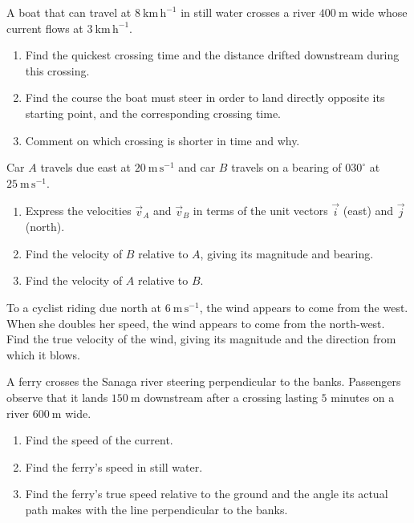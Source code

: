 \documentclass[11pt]{article}
\newcounter{popsec}
\newcounter{popsub}
\newcommand{\courssub}[1]{%
  \stepcounter{popsub}%
  \par\vspace{9pt}\noindent{\popxbold\fontsize{11.5}{13}\selectfont\color{popink}{\color{poporange}\thepopsec.\thepopsub}\hspace{6pt}#1}\par\nopagebreak\vspace{4pt}
}
\begin{document}
\courssub{I practise}

\begin{exercice}
A boat that can travel at $8\ \mathrm{km\,h^{-1}}$ in still water crosses a river $400\ \mathrm{m}$ wide whose current flows at $3\ \mathrm{km\,h^{-1}}$.
\begin{enumerate}
\item Find the quickest crossing time and the distance drifted downstream during this crossing.
\item Find the course the boat must steer in order to land directly opposite its starting point, and the corresponding crossing time.
\item Comment on which crossing is shorter in time and why.
\end{enumerate}
\end{exercice}

\begin{exercice}
Car $A$ travels due east at $20\ \mathrm{m\,s^{-1}}$ and car $B$ travels on a bearing of $030^{\circ}$ at $25\ \mathrm{m\,s^{-1}}$.
\begin{enumerate}
\item Express the velocities $\vec{v}_A$ and $\vec{v}_B$ in terms of the unit vectors $\vec{i}$ (east) and $\vec{j}$ (north).
\item Find the velocity of $B$ relative to $A$, giving its magnitude and bearing.
\item Find the velocity of $A$ relative to $B$.
\end{enumerate}
\end{exercice}

\begin{exercice}
To a cyclist riding due north at $6\ \mathrm{m\,s^{-1}}$, the wind appears to come from the west. When she doubles her speed, the wind appears to come from the north-west. Find the true velocity of the wind, giving its magnitude and the direction from which it blows.
\end{exercice}

\begin{exercice}
A ferry crosses the Sanaga river steering perpendicular to the banks. Passengers observe that it lands $150\ \mathrm{m}$ downstream after a crossing lasting $5$ minutes on a river $600\ \mathrm{m}$ wide.
\begin{enumerate}
\item Find the speed of the current.
\item Find the ferry's speed in still water.
\item Find the ferry's true speed relative to the ground and the angle its actual path makes with the line perpendicular to the banks.
\end{enumerate}
\end{exercice}
\end{document}

